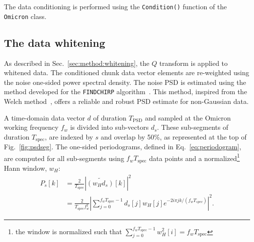 The data conditioning is performed using the \texttt{Condition()} function of the \texttt{Omicron} class.


\subsection{The data whitening} \label{sec:algorithm:whitening}

As described in Sec.~\ref{sec:method:whitening}, the $Q$ transform is applied to whitened data. The conditioned chunk data vector elements are re-weighted using the noise one-sided power spectral density. The noise PSD is estimated using the method developed for the \texttt{FINDCHIRP} algorithm~\cite{Allen:2005fk}. This method, inspired from the Welch method~\cite{Welch:1967}, offers a reliable and robust PSD estimate for non-Gaussian data.

A time-domain data vector $d$ of duration $T_\mathrm{PSD}$ and sampled at the Omicron working frequency $f_w$ is divided into sub-vectors $d_s$. These sub-segments of duration $T_\mathrm{spec}$, are indexed by $s$ and overlap by 50\%, as represented at the top of Fig.~\ref{fig:psdseg}. The one-sided periodograms, defined in Eq.~\ref{eq:periodogram}, are computed for all sub-segments using $f_wT_\mathrm{spec}$ data points and a normalized\footnote{the window is normalized such that $\sum_{j=0}^{f_wT_\mathrm{spec}-1}{w_H^2[i]} = f_wT_\mathrm{spec}$} Hann window, $w_H$:
\begin{align}
  P_s[k] &= \frac{2}{T_\mathrm{spec}}\left|\widetilde{(w_Hd_s)}[k]\right|^2 \\
  &= \frac{2}{T_\mathrm{spec}f_w^2}\left|\sum_{j=0}^{f_wT_\mathrm{spec}-1}{d_s[j]w_H[j]e^{-2i\pi jk/(f_wT_{spec})}}\right|^2.
\end{align}

